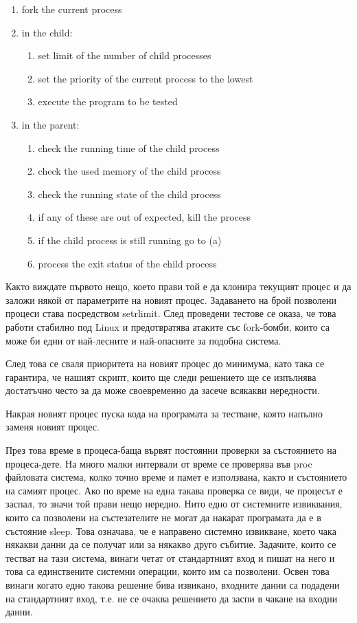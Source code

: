 \documentclass[a4paper,12pt]{article}
\begin{document}
  \begin{enumerate}
    \item fork the current process
    \item in the child:
    \begin{enumerate}
      \item set limit of the number of child processes
      \item set the priority of the current process to the lowest
      \item execute the program to be tested
    \end{enumerate}
    \item in the parent:
    \begin{enumerate}
      \item check the running time of the child process
      \item check the used memory of the child process
      \item check the running state of the child process
      \item if any of these are out of expected, kill the process
      \item if the child process is still running go to (a)
      \item process the exit status of the child process
    \end{enumerate}
  \end{enumerate}
  
  Както виждате първото нещо, което прави той е да клонира текущият процес и да заложи някой от параметрите на новият процес. Задаването на брой позволени процеси става посредством setrlimit. След проведени тестове се оказа, че това работи стабилно под Linux и предотвратява атаките със fork-бомби, които са може би едни от най-лесните и най-опасните за подобна система.
  
  След това се сваля приоритета на новият процес до минимума, като така се гарантира, че нашият скрипт, които ще следи решението ще се изпълнява достатъчно често за да може своевременно да засече всякакви нередности.
  
  Накрая новият процес пуска кода на програмата за тестване, която напълно заменя новият процес.
  
  През това време в процеса-баща вървят постоянни проверки за състоянието на процеса-дете. На много малки интервали от време се проверява във proc файловата система, колко точно време и памет е използвана, както и състоянието на самият процес. Ако по време на една такава проверка се види, че процесът е заспал, то значи той прави нещо нередно. Нито едно от системните извиквания, които са позволени на състезателите не могат да накарат програмата да е в състояние sleep. Това означава, че е направено системно извикване, което чака някакви данни да се получат или за някакво друго събитие. Задачите, които се тестват на тази система, винаги четат от стандартният вход и пишат на него и това са единствените системни операции, които им са позволени. Освен това винаги когато едно такова решение бива извикано, входните данни са подадени на стандартният вход, т.е. не се очаква решението да заспи в чакане на входни данни.
  
\end{document}
